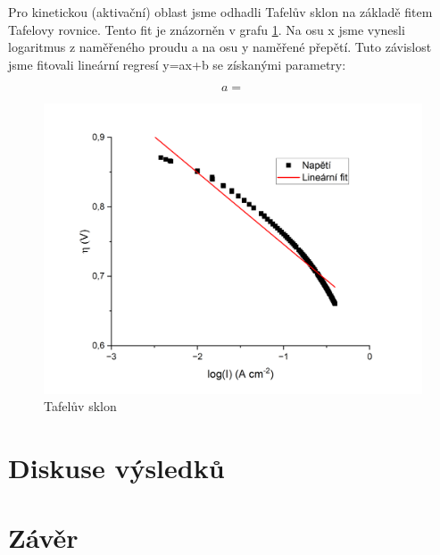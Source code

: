 Pro kinetickou (aktivační) oblast jsme odhadli Tafelův sklon na základě fitem Tafelovy rovnice. Tento fit je znázorněn v grafu \ref{fig:Tafelův-sklon}. Na osu x jsme vynesli logaritmus z naměřeného proudu a na osu y naměřené přepětí. Tuto závislost jsme fitovali lineární regresí y=ax+b se získanými parametry:

\begin{equation}
    a = 
\end{equation}

\begin{figure}[!h]
    \centering
    \includegraphics[width=1\linewidth]{H1 - vodíkový palivový článek//Tafelův sklon.png}
    \caption{Tafelův sklon}
    \label{fig:Tafelův-sklon}
\end{figure}
    
\section{Diskuse výsledků}

\section{Závěr}
